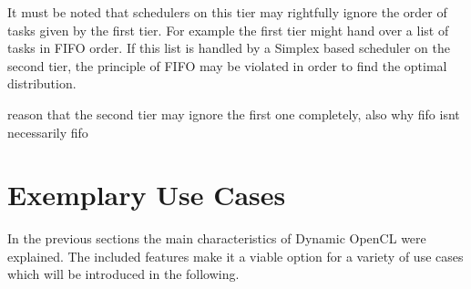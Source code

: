 It must be noted that schedulers on this tier may rightfully ignore the order of tasks given by the first tier. For example the first tier might hand over a list of tasks in FIFO order. If this list is handled by a Simplex based scheduler on the second tier, the principle of FIFO may be violated in order to find the optimal distribution.

reason that the second tier may ignore the first one completely, also why fifo isnt necessarily fifo
\section{Exemplary Use Cases}

In the previous sections the main characteristics of Dynamic OpenCL were explained. The included features make it a viable option for a variety of use cases which will be introduced in the following.

